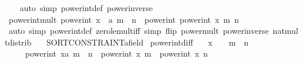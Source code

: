 \begin{isabellebody}
%
\isadelimproof
\ \ %
\endisadelimproof
%
\isatagproof
{}\isamarkupfalse%
\ {\isacharparenleft}{\kern0pt}auto\ simp{\isacharcolon}{\kern0pt}\ power{\isacharunderscore}{\kern0pt}int{\isacharunderscore}{\kern0pt}def\ power{\isacharunderscore}{\kern0pt}inverse{\isacharparenright}{\kern0pt}%
\endisatagproof
{\isafoldproof}%
%
\isadelimproof
\isanewline
%
\endisadelimproof
\isanewline
{}\isamarkupfalse%
\ power{\isacharunderscore}{\kern0pt}int{\isacharunderscore}{\kern0pt}mult{\isacharcolon}{\kern0pt}\ {\isachardoublequoteopen}power{\isacharunderscore}{\kern0pt}int\ {\isacharparenleft}{\kern0pt}x\ {\isacharcolon}{\kern0pt}{\isacharcolon}{\kern0pt}\ {\isacharprime}{\kern0pt}a{\isacharparenright}{\kern0pt}\ {\isacharparenleft}{\kern0pt}m\ {\isacharasterisk}{\kern0pt}\ n{\isacharparenright}{\kern0pt}\ {\isacharequal}{\kern0pt}\ power{\isacharunderscore}{\kern0pt}int\ {\isacharparenleft}{\kern0pt}power{\isacharunderscore}{\kern0pt}int\ x\ m{\isacharparenright}{\kern0pt}\ n{\isachardoublequoteclose}\isanewline
%
\isadelimproof
\ \ %
\endisadelimproof
%
\isatagproof
{}\isamarkupfalse%
\ {\isacharparenleft}{\kern0pt}auto\ simp{\isacharcolon}{\kern0pt}\ power{\isacharunderscore}{\kern0pt}int{\isacharunderscore}{\kern0pt}def\ zero{\isacharunderscore}{\kern0pt}le{\isacharunderscore}{\kern0pt}mult{\isacharunderscore}{\kern0pt}iff\ simp\ flip{\isacharcolon}{\kern0pt}\ power{\isacharunderscore}{\kern0pt}mult\ power{\isacharunderscore}{\kern0pt}inverse\ nat{\isacharunderscore}{\kern0pt}mult{\isacharunderscore}{\kern0pt}distrib{\isacharparenright}{\kern0pt}%
\endisatagproof
{\isafoldproof}%
%
\isadelimproof
\isanewline
%
\endisadelimproof
\isanewline
{}\isamarkupfalse%
\isanewline
\isanewline
{}\isamarkupfalse%
\isanewline
\ \ \ {\isachardoublequoteopen}SORT{\isacharunderscore}{\kern0pt}CONSTRAINT{\isacharparenleft}{\kern0pt}{\isacharprime}{\kern0pt}a{\isacharcolon}{\kern0pt}{\isacharcolon}{\kern0pt}field{\isacharparenright}{\kern0pt}{\isachardoublequoteclose}\isanewline
{}\isanewline
\isanewline
{}\isamarkupfalse%
\ power{\isacharunderscore}{\kern0pt}int{\isacharunderscore}{\kern0pt}diff{\isacharcolon}{\kern0pt}\isanewline
\ \ \ {\isachardoublequoteopen}x\ {\isasymnoteq}\ {}\ {\isasymor}\ m\ {\isasymnoteq}\ n{\isachardoublequoteclose}\isanewline
\ \ \ \ \ {\isachardoublequoteopen}power{\isacharunderscore}{\kern0pt}int\ {\isacharparenleft}{\kern0pt}x{\isacharcolon}{\kern0pt}{\isacharcolon}{\kern0pt}{\isacharprime}{\kern0pt}a{\isacharparenright}{\kern0pt}\ {\isacharparenleft}{\kern0pt}m\ {\isacharminus}{\kern0pt}\ n{\isacharparenright}{\kern0pt}\ {\isacharequal}{\kern0pt}\ power{\isacharunderscore}{\kern0pt}int\ x\ m\ {\isacharslash}{\kern0pt}\ power{\isacharunderscore}{\kern0pt}int\ x\ n{\isachardoublequoteclose}\isanewline

\end{isabellebody}
